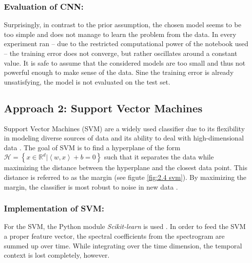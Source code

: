 \documentclass[11pt,a4paper,twoside]{article}
\theoremstyle{thmbreak}
\numberwithin{Theorem}{subsection}
\theoremstyle{defbreak}
\theoremstyle{remark}
\theoremstyle{remark}
\begin{document}
\subsubsection{Evaluation of CNN:}

Surprisingly, in contrast to the prior assumption, the chosen model seems to be too simple and does not manage to learn the problem from the data. 
In every experiment ran -- due to  the restricted computational power  of the notebook used -- the training error does not converge, but rather oscillates around a constant value. 
It is safe to assume that the considered models  are too small and thus not powerful enough to make sense of the data.
Sine the training error is already unsatisfying, the model is not evaluated on the test set. 


\subsection{Approach 2: Support Vector Machines}
\label{SVM}
Support Vector Machines (SVM) are a widely used classifier due to its flexibility in modeling diverse sources of data and its ability to deal with high-dimensional data \cite{ben2010user}.
The goal of SVM is to find a hyperplane of the form $\mathcal{H} = \left\lbrace x \in \mathbb{R}^d | \left\langle w,x\right\rangle + b =0 \right\rbrace $ such that it separates the data while maximizing the distance between the hyperplane and the closest data point. This distance is referred to as the margin (see figute \ref{fig:2.4 svm}). By maximizing the margin, the classifier is most robust to noise in new data \cite{bishop2006pattern}. 


\subsubsection{Implementation of SVM:}

For the SVM, the  Python module \textit{Scikit-learn} is used \cite{scikit-learn}.
In order to feed the SVM a proper feature vector, the spectral coefficients from the spectrogram are  summed up over time.
While integrating over the time dimension, the temporal context is lost completely, however.
\end{document}
